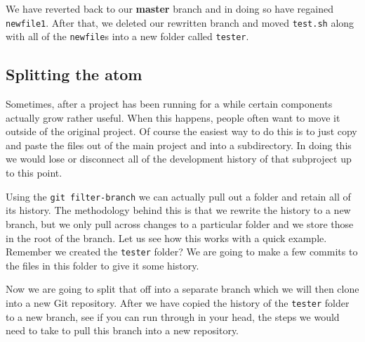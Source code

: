 We have reverted back to our \textbf{master} branch and in doing so have regained \texttt{newfile1}.
After that, we deleted our rewritten branch and moved \texttt{test.sh} along with all of the \texttt{newfile}s into a new folder called \texttt{tester}.

\subsection{Splitting the atom}
Sometimes, after a project has been running for a while certain components actually grow rather useful.
When this happens, people often want to move it outside of the original project.
Of course the easiest way to do this is to just copy and paste the files out of the main project and into a subdirectory.
In doing this we would lose or disconnect all of the development history of that subproject up to this point.

Using the \texttt{git filter-branch} we can actually pull out a folder and retain all of its history.
The methodology behind this is that we rewrite the history to a new branch, but we only pull across changes to a particular folder and we store those in the root of the branch.
Let us see how this works with a quick example.
Remember we created the \texttt{tester} folder?
We are going to make a few commits to the files in this folder to give it some history.


Now we are going to split that off into a separate branch which we will then clone into a new Git repository.
After we have copied the history of the \texttt{tester} folder to a new branch, see if you can run through in your head, the steps we would need to take to pull this branch into a new repository.

